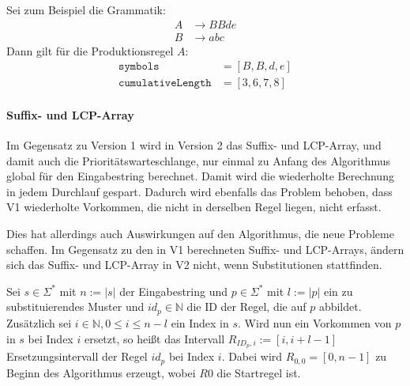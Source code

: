 Sei zum Beispiel die Grammatik: 
\begin{align*}
	A &\rightarrow BBde\\
	B &\rightarrow abc
\end{align*}
Dann gilt für die Produktionsregel $A$: 
\begin{align*}
	\texttt{symbols} &= [B, B, d, e]\\
	\texttt{cumulativeLength} &= [3, 6, 7, 8]
\end{align*}

\paragraph{Suffix- und LCP-Array}
Im Gegensatz zu Version 1 wird in Version 2 das Suffix- und LCP-Array, und damit auch die Prioritätswarteschlange, nur einmal zu Anfang des Algorithmus global für den Eingabestring berechnet. Damit wird die wiederholte Berechnung in jedem Durchlauf gespart. 
Dadurch wird ebenfalls das Problem behoben, dass V1 wiederholte Vorkommen, die nicht in derselben Regel liegen, nicht erfasst.

Dies hat allerdings auch Auswirkungen auf den Algorithmus, die neue Probleme schaffen. Im Gegensatz zu den in V1 berechneten Suffix- und LCP-Arrays, ändern sich das Suffix- und LCP-Array in V2 nicht, wenn Substitutionen stattfinden. 

Sei $s \in \Sigma^*$ mit $n := |s|$ der Eingabestring und $p \in \Sigma^*$ mit $l := |p|$  ein zu substituierendes Muster und $id_p \in \mathbb{N}$ die ID der Regel, die auf $p$ abbildet. Zusätzlich sei $i \in \mathbb{N}, 0 \leq i \leq n - l$ ein Index in $s$. Wird nun ein Vorkommen von $p$ in $s$ bei Index $i$ ersetzt, so heißt das Intervall $R_{ID_p, i} := [i, i + l - 1]$ Ersetzungsintervall der Regel $id_p$ bei Index $i$. Dabei wird $R_{0, 0} = [0, n-1]$ zu Beginn des Algorithmus erzeugt, wobei $R0$ die Startregel ist. \\


